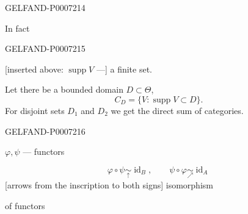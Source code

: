 \begin{GelfandAdjacentEvidence}{GELFAND-P000721}{4}


In fact
\end{GelfandAdjacentEvidence}
\begin{GelfandAdjacentEvidence}{GELFAND-P000721}{5}

[inserted above: \(\operatorname{supp}V\) ---] a finite set.

Let there be a bounded domain \(D\subset\Theta\),
\[
C_D=\{V:\operatorname{supp}V\subset D\}.
\]
For disjoint sets \(D_1\) and \(D_2\) we get the direct sum of categories.

\end{GelfandAdjacentEvidence}
\begin{GelfandAdjacentEvidence}{GELFAND-P000721}{6}


\(\varphi,\psi\) --- functors

\[
\varphi\circ\psi\underset{\uparrow}{\sim}\operatorname{id}_B,
\qquad
\psi\circ\varphi\underset{\nearrow}{\sim}\operatorname{id}_A
\]
[arrows from the inscription to both signs] isomorphism
\end{GelfandAdjacentEvidence}

of functors


